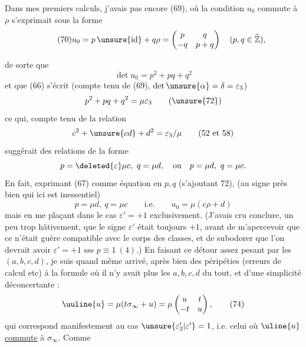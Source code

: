 Dans mes premiers calculs, j'avais pas encore  (69), où la condition $u_0$ commute à $\rho$ s'exprimait sous la forme
\[
\tag{70}u_0=p\,\unsure{\mathrm{id}}+q\rho=\begin{pmatrix}p&q\\-q&p+q\end{pmatrix}\quad(p,q\in\widehat{\mathbb Z}),
\]


de sorte que
\[
\det u_0=p^2+pq+q^2
\tag{71}
\]
et que (66) s'écrit (compte tenu de (69), 
$\det\unsure{\alpha}=\delta=\varepsilon_3$)
\[
p^2+pq+q^2=\mu\varepsilon_3
\tag{\unsure{72}}
\]
ce qui, compte tenu de la relation
\[
c^2+\unsure{cd}+d^2=\varepsilon_3/\mu
\qquad(52\text{ et }58)
\]
suggérait des relations de la forme
\[
p=\deleted{\varepsilon}\mu c,\ q=\mu d,\quad
\text{ou}\quad p=\mu d,\ q=\mu c.
\]
En fait, exprimant (67) comme équation en $p,q$
(s'ajoutant  72), 
(au signe près bien 
qui ici est inessentiel)
\[
p=\mu d,\ q=\mu c\qquad\text{i.e.}\qquad u_0=\mu(c\rho+d)
\tag{73}
\]
mais en me plaçant dans le cas $\varepsilon'=+1$ exclusivement.
(J'avais cru conclure, un peu trop hâtivement, que le
signe $\varepsilon'$ était toujours $+1$, avant de m'apercevoir
que ce n'était guère compatible avec le corps des
classes, et de subodorer que l'on devrait avoir $\varepsilon'=+1$
sss $p\equiv1\ (4)$.) En faisant ce détour assez pesant
par les $(a,b,c,d)$, je suis quand même arrivé, après
bien des péripéties (erreurs de calcul etc) à la
formule où il n'y avait plus les $a,b,c,d$ du tout,
et d'une simplicité déconcertante :
\[
\uuline{u}=\mu(t\sigma_\infty+u)
=\mu\begin{pmatrix}u&t\\-t&u\end{pmatrix},
\tag{74}
\]
qui correspond manifestement au cas $\unsure{\varepsilon'_2|\varepsilon'}=1$, i.e.
celui où $\uline{u}$ \uline{commute} à $\sigma_\infty$. Comme



